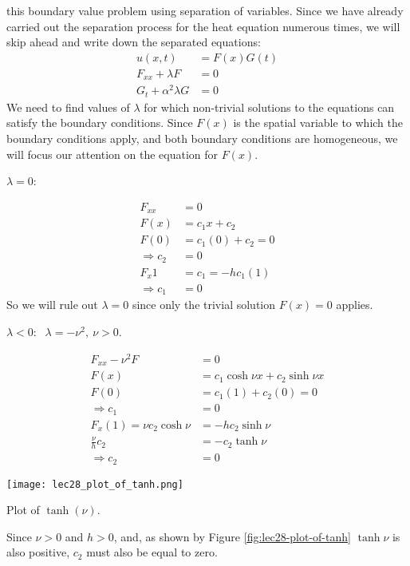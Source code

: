  this boundary value problem using separation of variables.  Since we have already carried out the separation process for the heat equation numerous times, we will skip ahead and write down the separated equations:
\begin{align*}
u(x,t) &= F(x)G(t) \\
F_{xx} + \lambda F &= 0 \\
G_{t} + \alpha^2 \lambda G &= 0 
\end{align*}
We need to find values of $\lambda$ for which non-trivial solutions to the equations can satisfy the boundary conditions.  Since $F(x)$ is the spatial variable to which the boundary conditions apply, and both boundary conditions are homogeneous, we will focus our attention on the equation for $F(x)$.

\vspace{0.25cm}

\noindent \underline{$\lambda = 0$}:

\begin{align*}
F_{xx} &= 0 \\
F(x) &= c_1x + c_2 \\
F(0) &= c_1(0) + c_2 = 0 \\
\Rightarrow c_2 &= 0 \\
F_x{1} &= c_1 = -hc_1(1) \\
\Rightarrow c_1&= 0
\end{align*} So we will rule out $\lambda=0$ since only the trivial solution $F(x)=0$ applies.

\vspace{0.25cm}

\noindent \underline{$\lambda < 0$}:  $\ \ \lambda = -\nu^2, \ \nu>0$.

\begin{align*}
F_{xx} - \nu^2F &= 0 \\
F(x) &= c_1 \cosh{\nu x} + c_2 \sinh{\nu x} \\
F(0) &= c_1(1) + c_2(0) = 0 \\
\Rightarrow c_1 &= 0 \\
F_{x}(1) = \nu c_2 \cosh{\nu} &= -h c_2 \sinh{\nu} \\
\frac{\nu}{h}c_2 &= -c_2\tanh{\nu} \\
\Rightarrow c_2 &= 0
\end{align*}
\begin{marginfigure}
\texttt{[image: lec28\_plot\_of\_tanh.png]}
\caption{Plot of $\tanh{(\nu)}$.}
\label{fig:lec28-plot-of-tanh}
\end{marginfigure}
Since $\nu>0$ and $h>0$, and, as shown by Figure \ref{fig:lec28-plot-of-tanh} $\tanh{\nu}$ is also positive, $c_2$ must also be equal to zero.

